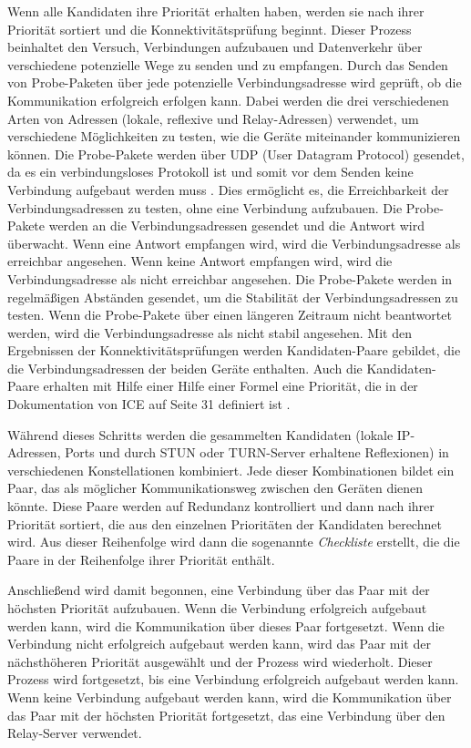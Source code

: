 Wenn alle Kandidaten ihre Priorität erhalten haben, werden sie nach ihrer Priorität sortiert und die Konnektivitätsprüfung beginnt. Dieser Prozess beinhaltet den Versuch, Verbindungen aufzubauen und Datenverkehr über verschiedene potenzielle Wege zu senden und zu empfangen.
Durch das Senden von Probe-Paketen über jede potenzielle Verbindungsadresse wird geprüft, ob die Kommunikation erfolgreich erfolgen kann. Dabei werden die drei verschiedenen Arten von Adressen (lokale, reflexive und Relay-Adressen) verwendet, um verschiedene Möglichkeiten zu testen, wie die Geräte miteinander kommunizieren können. Die Probe-Pakete werden über UDP (User Datagram Protocol) gesendet, da es ein verbindungsloses Protokoll ist und somit vor dem Senden keine Verbindung aufgebaut werden muss \parencite[S. 1]{rfc768_UDP}. Dies ermöglicht es, die Erreichbarkeit der Verbindungsadressen zu testen, ohne eine Verbindung aufzubauen. Die Probe-Pakete werden an die Verbindungsadressen gesendet und die Antwort wird überwacht. Wenn eine Antwort empfangen wird, wird die Verbindungsadresse als erreichbar angesehen. Wenn keine Antwort empfangen wird, wird die Verbindungsadresse als nicht erreichbar angesehen. Die Probe-Pakete werden in regelmäßigen Abständen gesendet, um die Stabilität der Verbindungsadressen zu testen. Wenn die Probe-Pakete über einen längeren Zeitraum nicht beantwortet werden, wird die Verbindungsadresse als nicht stabil angesehen. 
Mit den Ergebnissen der Konnektivitätsprüfungen werden Kandidaten-Paare gebildet, die die Verbindungsadressen der beiden Geräte enthalten. Auch die Kandidaten-Paare erhalten mit Hilfe einer Hilfe einer Formel eine Priorität, die in der Dokumentation von ICE auf Seite 31 definiert ist \parencite[S. 31]{rfc8445_ICE}.

Während dieses Schritts werden die gesammelten Kandidaten (lokale IP-Adressen, Ports und durch STUN oder TURN-Server erhaltene Reflexionen) in verschiedenen Konstellationen kombiniert. Jede dieser Kombinationen bildet ein Paar, das als möglicher Kommunikationsweg zwischen den Geräten dienen könnte. Diese Paare werden auf Redundanz kontrolliert und dann nach ihrer Priorität sortiert, die aus den einzelnen Prioritäten der Kandidaten berechnet wird. Aus dieser Reihenfolge wird dann die sogenannte \textit{Checkliste} erstellt, die die Paare in der Reihenfolge ihrer Priorität enthält.





Anschließend  wird damit begonnen, eine Verbindung über das Paar mit der höchsten Priorität aufzubauen. Wenn die Verbindung erfolgreich aufgebaut werden kann, wird die Kommunikation über dieses Paar fortgesetzt. Wenn die Verbindung nicht erfolgreich aufgebaut werden kann, wird das Paar mit der nächsthöheren Priorität ausgewählt und der Prozess wird wiederholt. Dieser Prozess wird fortgesetzt, bis eine Verbindung erfolgreich aufgebaut werden kann. Wenn keine Verbindung aufgebaut werden kann, wird die Kommunikation über das Paar mit der höchsten Priorität fortgesetzt, das eine Verbindung über den Relay-Server verwendet.




